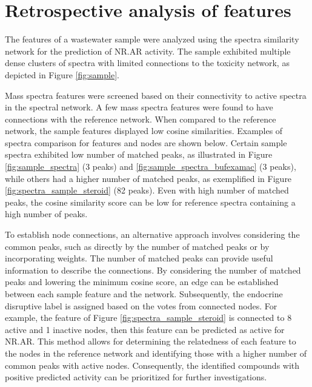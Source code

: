

\section*{Retrospective analysis of \tMS{} features}

The \tMS{} features of a wastewater sample were analyzed using the spectra similarity network for the prediction of NR.AR activity. The sample exhibited multiple dense clusters of spectra with limited connections to the toxicity network, as depicted in Figure \ref{fig:sample}.

Mass spectra features were screened based on their connectivity to active spectra in the spectral network. A few mass spectra features were found to have connections with the reference network. When compared to the reference network, the sample features displayed low cosine similarities. Examples of spectra comparison for features and nodes are shown below. Certain sample spectra exhibited low number of matched peaks, as illustrated in Figure \ref{fig:sample_spectra} (3 peaks) and \ref{fig:sample_spectra_bufexamac} (3 peaks), while others had a higher number of matched peaks, as exemplified in Figure \ref{fig:spectra_sample_steroid} (82 peaks). Even with high number of matched peaks, the cosine similarity score can be low for reference spectra containing a high number of peaks.

To establish node connections, an alternative approach involves considering the common peaks, such as directly by the number of matched peaks or by incorporating weights. The number of matched peaks can provide useful information to describe the connections. By considering the number of matched peaks and lowering the minimum cosine score, an edge can be established between each sample feature and the network. Subsequently, the endocrine disruptive label is assigned based on the votes from connected nodes. For example, the feature of Figure  \ref{fig:spectra_sample_steroid} is connected to 8 active and 1 inactive nodes, then this feature can be predicted as active for NR.AR. This method allows for determining the relatedness of each feature to the nodes in the reference network and identifying those with a higher number of common peaks with active nodes. Consequently, the identified compounds with positive predicted activity can be prioritized for further investigations.

